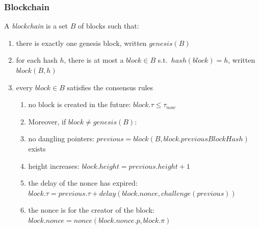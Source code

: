 \documentclass[11pt]{beamer}  %
\newcommand{\nonce}{{\mathit{nonce}}}
\newcommand{\previous}{{\mathit{previous}}}
\newcommand{\challenge}{{\mathit{challenge}}}
\newcommand{\delay}{{\mathit{delay}}}
\newcommand{\height}{{\mathit{height}}}
\renewcommand{\block}{{\mathit{block}}}
\newcommand{\now}{{\mathit{now}}}
\newcommand{\hash}{{\mathit{hash}}}
\newcommand{\previousblockhash}{{\mathit{previousBlockHash}}}
\newcommand{\genesis}{{\mathit{genesis}}}
\begin{document}
\begin{frame}\frametitle{Blockchain}

  A \emph{blockchain} is a set $B$ of blocks such that:
  \begin{enumerate}
    \pause
  \item there is exactly one genesis block, written $\genesis(B)$
    \pause
  \item for each hash $h$, there is at most a $\block\in B$ s.t.\ $\hash(\block)=h$,
    written $\block(B,h)$
    \pause
  \item every $\block\in B$ satisfies the {\color{red}consensus rules}
    \begin{enumerate}
      \pause
    \item[a] {\color{red}no block is created in the future:} $\block.\tau\le\tau_\now$
      \pause
    \item[] Moreover, if $\block\not=\genesis(B)$:
      \pause
    \item[b] {\color{red}no dangling pointers:}
      $\previous=\block(B,\block.\previousblockhash)$ exists
      \pause
    \item[c] {\color{red}height increases:} $\block.\height=\previous.\height+1$
      \pause
    \item[d] {\color{red}the delay of the nonce has expired:} $\block.\tau=\previous.\tau+\delay(\block.\nonce,\challenge(\previous))$
      \pause
    \item[e] {\color{red}the nonce is for the creator of the block:}
      $\block.\nonce=\nonce(\block.\nonce.p,\block.\pi)$
    \end{enumerate}
  \end{enumerate}
\end{frame}
\end{document}
